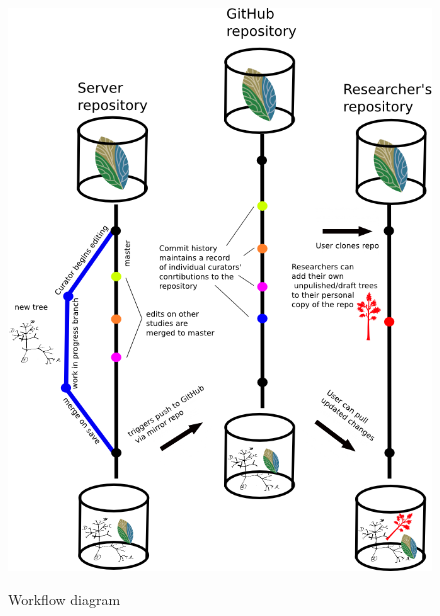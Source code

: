 \documentclass{bioinfo}
\begin{document}
\begin{figure}
\caption{Workflow diagram} 
\includegraphics[scale=0.4]{workflow.png}
\label{workflow}
\end{figure}
\end{document}
